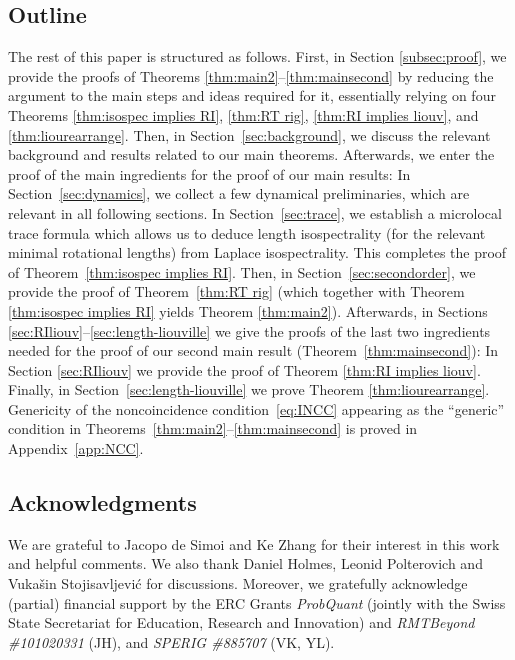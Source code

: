 \documentclass[11pt,letterpaper,oneside]{amsart}
\theoremstyle{definition}
\theoremstyle{remark}
\theoremstyle{definition}
\theoremstyle{remark}
\begin{document}
\subsection{Outline} 
The rest of this paper is structured as follows. First, in Section \ref{subsec:proof}, we provide the proofs of Theorems \ref{thm:main2}--\ref{thm:mainsecond} by reducing the argument to the main steps and ideas required for it, essentially relying on four Theorems \ref{thm:isospec implies RI}, \ref{thm:RT rig}, \ref{thm:RI implies liouv}, and \ref{thm:liourearrange}. Then, in Section~\ref{sec:background}, we discuss the relevant background and results related to our main theorems. Afterwards, we enter the proof of the main ingredients for the proof of our main results: In Section~\ref{sec:dynamics}, we collect a few dynamical preliminaries, which are relevant in all following sections. In Section~\ref{sec:trace}, we establish a microlocal trace formula which allows us to deduce length isospectrality (for the relevant minimal rotational lengths) from Laplace isospectrality. This completes the proof of Theorem~\ref{thm:isospec implies RI}. Then, in Section~\ref{sec:secondorder}, we provide the proof of Theorem~\ref{thm:RT rig} (which together with Theorem \ref{thm:isospec implies RI} yields Theorem \ref{thm:main2}). Afterwards, in Sections \ref{sec:RIliouv}--\ref{sec:length-liouville} we give the proofs of the last two ingredients needed for the proof of our second main result (Theorem~\ref{thm:mainsecond}): In Section \ref{sec:RIliouv} we provide the proof of Theorem \ref{thm:RI implies liouv}. Finally, in Section~\ref{sec:length-liouville} we prove Theorem \ref{thm:liourearrange}. 
Genericity of the noncoincidence condition~\eqref{eq:INCC} appearing as the ``generic'' condition in Theorems~\ref{thm:main2}--\ref{thm:mainsecond} is proved in Appendix~\ref{app:NCC}. 

\subsection*{Acknowledgments}
We are grateful to Jacopo de Simoi and Ke Zhang for their interest in this work and helpful comments. We also thank Daniel Holmes, Leonid Polterovich and Vukašin Stojisavljević for discussions. Moreover, we gratefully acknowledge (partial) financial support by the ERC Grants \emph{ProbQuant} (jointly with the Swiss State
Secretariat for Education, Research and Innovation) and \emph{RMTBeyond \#101020331} (JH), and \emph{SPERIG \#885707} (VK, YL).
\end{document}
